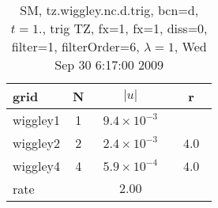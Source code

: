 \begin{table}[hbt]\tableFont %
\begin{center}
\begin{tabular}{|l|c|c|c|} \hline 
grid  & N &  $\vert u \vert$   & r \\ \hline 
            wiggley1 &     1 & ~$9.4\times10^{ -3}$~ &            \\ \hline
            wiggley2 &     2 & ~$2.4\times10^{ -3}$~ & ~$  4.0$~  \\ \hline
            wiggley4 &     4 & ~$5.9\times10^{ -4}$~ & ~$  4.0$~  \\ \hline
    rate             &       &       $2.00$         &        \\ \hline
\end{tabular}
\caption{SM, tz.wiggley.nc.d.trig, bcn=d, $t=1.$, trig TZ, fx=1, fx=1, diss=0, filter=1, filterOrder=6, $\lambda=1$, Wed Sep 30  6:17:00 2009}\label{table:tz.wiggley.nc.d.trig}
\end{center}
\end{table}
